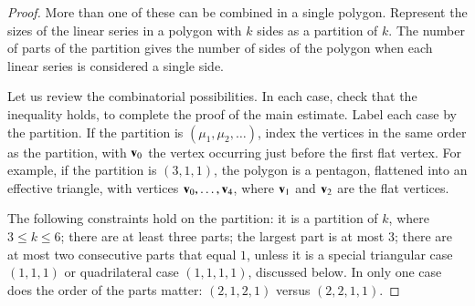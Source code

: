 \begin{proof}
More than one of these can be combined in a single polygon.   Represent the sizes of the linear series in a polygon with $k$ sides as a partition of $k$.
The number of parts of the partition gives the number of sides of the polygon when each linear series is considered a single side. 
%

Let us review the combinatorial possibilities.  In each case,  check that the inequality holds, to complete the proof of the main estimate.  Label each 
case by the partition.  If the partition is $(\mu_1,\mu_2,\ldots)$, 
index the vertices in the same order as the partition, with ${\mathbf v}_0$
the vertex occurring just before the first flat vertex.  For example,
if the partition is $(3,1,1)$, the polygon is a pentagon, flattened into
an effective triangle, with vertices ${\mathbf v}_0,\ldots,{\mathbf v}_4$, where ${\mathbf v}_1$ and ${\mathbf v}_2$
are the flat vertices.
%

The following constraints hold on the partition: it is
a partition of $k$, where $3\le k\le 6$; there
are at least three parts; the largest part is at most $3$;  there are
at most two consecutive parts that equal $1$, unless it is a special triangular case $(1,1,1)$ or
quadrilateral case $(1,1,1,1)$, discussed below.  In only one case
does the order of the parts matter: $(2,1,2,1)$ versus $(2,2,1,1)$.


\end{proof}
